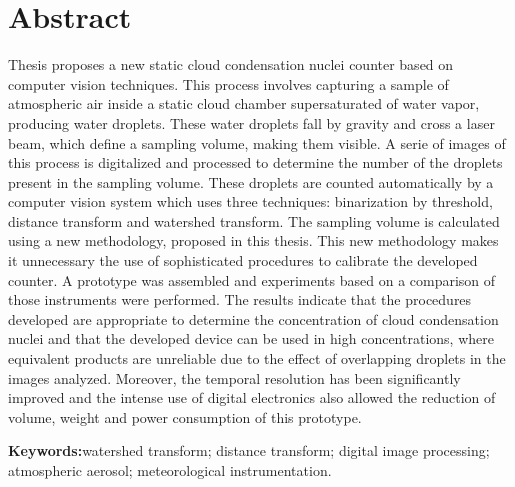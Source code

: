 \chapter*{Abstract}
\label{CHP:ABSTRACT}%
\thispagestyle{empty}
 Thesis proposes a new static cloud condensation nuclei counter based on computer vision techniques. This process involves capturing a sample of atmospheric air inside a static cloud chamber supersaturated of water vapor, producing water droplets. These water droplets fall by gravity and cross a  laser beam, which define a sampling volume, making them visible. A serie of images of this process is digitalized and processed to determine the number of the droplets present in the sampling volume. These droplets are counted automatically by a computer vision system which uses three techniques: binarization by threshold, distance transform and watershed transform. The sampling volume is calculated using a new methodology, proposed in this thesis. This new methodology makes it unnecessary the use of sophisticated procedures to calibrate the developed counter. A prototype was assembled and experiments based on a comparison of those instruments were performed. The results indicate that the procedures developed are appropriate to determine the concentration of cloud condensation nuclei and that the developed device can be used in high concentrations, where equivalent products are unreliable due to the effect of overlapping droplets in the images analyzed. Moreover, the temporal resolution has been significantly improved and the intense use of digital electronics also allowed the reduction of volume, weight and power consumption of this prototype.

\noindent \textbf{Keywords:}watershed transform; distance transform; digital image processing; atmospheric aerosol; meteorological instrumentation.
